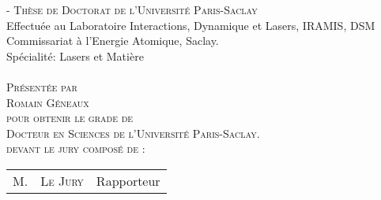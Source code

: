 \thispagestyle{empty}
\begin{adjustwidth}{}{-\marginwidth}
    \centering
    \huge{\textsc{Th\`ese de Doctorat de l'Universit\'e Paris-Saclay}}\\
    \large{Effectu\'ee au Laboratoire Interactions, Dynamique et Lasers, IRAMIS, DSM\\
    Commissariat \`a l'Energie Atomique, Saclay.}\\
    \vspace*{5mm}
    Sp\'ecialit\'e: Lasers et Mati\`ere\\
		\vspace*{10mm}
    \HUGE \scshape
    \thesistitle\\
    \vspace*{1.0cm}
    \normalfont
    \large{Pr\'esent\'ee par}\\ 
    \vspace*{3mm}
    \Huge{\textsc{Romain Géneaux}}\\
    \vspace*{3mm}
    \large
    pour obtenir le grade de\\
    \textsc{Docteur en Sciences de l'Universit\'e Paris-Saclay}.\\
    \vspace*{\fill} 
    devant le jury compos\'e de : \\
    \vspace*{5mm}
    \begin{tabularx}{12cm}{r X l}
				M. & \textsc{Le Jury} \dotfill & Rapporteur\\%
    \end{tabularx}\\
    \vspace*{15mm}
    \vspace*{-6mm}
    \normalfont
\end{adjustwidth}
\clearpage

